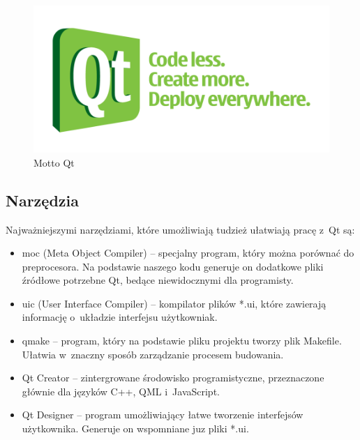 \begin{figure}
\centering
\includegraphics[scale=0.7]{img/qt-rule.png}
\caption{Motto Qt}
\end{figure}

\subsection{Narzędzia}
Najważniejszymi narzędziami, które umożliwiają tudzież ułatwiają pracę z~Qt są:
\begin{itemize}
\item moc (Meta Object Compiler) -- specjalny program, który można porównać do preprocesora. Na podstawie naszego kodu generuje on dodatkowe pliki źródłowe potrzebne Qt, bedące niewidocznymi dla programisty.
\item uic (User Interface Compiler) -- kompilator plików *.ui, które zawierają informację o~układzie interfejsu użytkowniak.
\item qmake -- program, który na podstawie pliku projektu tworzy plik Makefile. Ułatwia w~znaczny sposób zarządzanie procesem budowania.
\item Qt Creator -- zintergrowane środowisko programistyczne, przeznaczone głównie dla języków C++, QML i~JavaScript.
\item Qt Designer -- program umożliwiający łatwe tworzenie interfejsów użytkownika. Generuje on wspomniane juz pliki *.ui.
\end{itemize}


